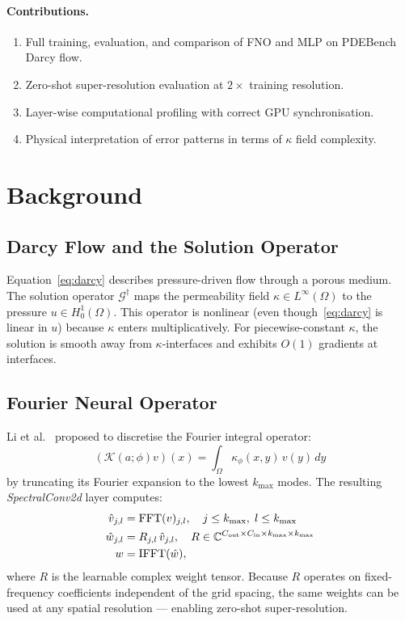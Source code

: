 \documentclass[11pt,a4paper]{article}
\begin{document}
\paragraph{Contributions.}
\begin{enumerate}[nosep]
  \item Full training, evaluation, and comparison of FNO and MLP on PDEBench Darcy flow.
  \item Zero-shot super-resolution evaluation at $2\times$ training resolution.
  \item Layer-wise computational profiling with correct GPU synchronisation.
  \item Physical interpretation of error patterns in terms of $\kappa$ field complexity.
\end{enumerate}

\section{Background}

\subsection{Darcy Flow and the Solution Operator}
Equation~\eqref{eq:darcy} describes pressure-driven flow through a porous medium. The solution operator $\mathcal{G}^\dagger$ maps the permeability field $\kappa \in L^\infty(\Omega)$ to the pressure $u \in H^1_0(\Omega)$. This operator is nonlinear (even though~\eqref{eq:darcy} is linear in $u$) because $\kappa$ enters multiplicatively. For piecewise-constant $\kappa$, the solution is smooth away from $\kappa$-interfaces and exhibits $O(1)$ gradients at interfaces.

\subsection{Fourier Neural Operator}
Li et al.\ \cite{li2021fno} proposed to discretise the Fourier integral operator:
\begin{equation}
  (\mathcal{K}(a;\phi)v)(x) = \int_\Omega \kappa_\phi(x,y)\,v(y)\,dy
\end{equation}
by truncating its Fourier expansion to the lowest $k_{\max}$ modes. The resulting \emph{SpectralConv2d} layer computes:
\begin{align}
  \hat{v}_{j,l} &= \text{FFT}(v)_{j,l}, \quad j\le k_{\max},\;l\le k_{\max} \\
  \hat{w}_{j,l} &= R_{j,l}\,\hat{v}_{j,l}, \quad R\in\mathbb{C}^{C_{\rm out}\times C_{\rm in}\times k_{\max}\times k_{\max}} \\
  w &= \text{IFFT}(\hat{w}),
\end{align}
where $R$ is the learnable complex weight tensor. Because $R$ operates on fixed-frequency coefficients independent of the grid spacing, the same weights can be used at any spatial resolution --- enabling zero-shot super-resolution.
\end{document}
